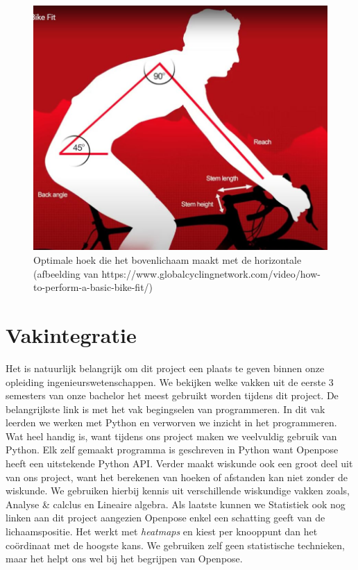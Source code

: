 \documentclass[a4paper,twoside,kulak]{kulakreport}
\begin{document}
\begin{figure}[H]
	\centering
	\includegraphics[width=\textwidth]{bikefit_romp}
	\caption{Optimale hoek die het bovenlichaam maakt met de horizontale (afbeelding van https://www.globalcyclingnetwork.com/video/how-to-perform-a-basic-bike-fit/)}
	\label{fig:bikefit_romp}
\end{figure}


\chapter{Vakintegratie}
Het is natuurlijk belangrijk om dit project een plaats te geven binnen onze opleiding ingenieurswetenschappen. We bekijken welke vakken uit de eerste 3 semesters van onze bachelor het meest gebruikt worden tijdens dit project. De belangrijkste link is met het vak begingselen van programmeren. In dit vak leerden we werken met Python en verworven we inzicht in het programmeren. Wat heel handig is, want tijdens ons project maken we veelvuldig gebruik van Python. Elk zelf gemaakt programma is geschreven in Python want Openpose heeft een uitstekende Python API. Verder maakt wiskunde ook een groot deel uit van ons project, want het berekenen van hoeken of afstanden kan niet zonder de wiskunde. We gebruiken hierbij kennis uit verschillende wiskundige vakken zoals, Analyse \& calclus en Lineaire algebra. Als laatste kunnen we Statistiek ook nog linken aan dit project aangezien Openpose enkel een schatting geeft van de lichaamspositie. Het werkt met \textit{heatmaps} en kiest per knooppunt dan het coördinaat met de hoogste kans. We gebruiken zelf geen statistische technieken, maar het helpt ons wel bij het begrijpen van Openpose.
\end{document}
